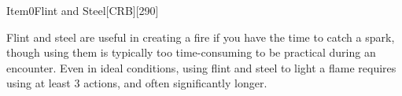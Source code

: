 
\begin{card}{Item}{0}{Flint and Steel}[CRB][290]

Flint and steel are useful in creating a fire if you have the time to catch a spark, 
though using them is typically too time-consuming to be practical during an encounter. 
Even in ideal conditions, using flint and steel to light a flame requires using at least 3 actions, 
and often significantly longer.


\vfill

\ItemBulk{-}
\end{card}
